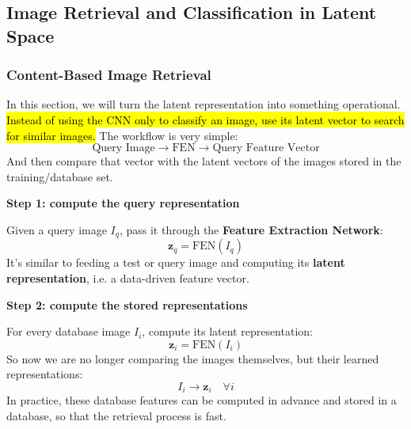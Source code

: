 \subsection{Image Retrieval and Classification in Latent Space}\label{sec:image-retrieval-and-classification-in-latent-space}

\subsubsection{Content-Based Image Retrieval}\label{sec:content-based-image-retrieval}

In this section, we will turn the latent representation into something operational. \hl{Instead of using the CNN only to classify an image, use its latent vector to search for similar images.} The workflow is very simple:
\begin{equation*}
    \text{Query Image} \to \text{FEN} \to \text{Query Feature Vector}
\end{equation*}
And then compare that vector with the latent vectors of the images stored in the training/database set.

\highspace
\begin{flushleft}
    \textcolor{Green3}{ \textbf{Step 1: compute the query representation}}
\end{flushleft}
Given a query image $I_q$, pass it through the \textbf{Feature Extraction Network}:
\begin{equation*}
    \mathbf{z}_{q} = \text{FEN}\left(I_q\right)
\end{equation*}
It's similar to feeding a test or query image and computing its \textbf{latent representation}, i.e. a data-driven feature vector.

\highspace
\begin{flushleft}
    \textcolor{Green3}{ \textbf{Step 2: compute the stored representations}}
\end{flushleft}
For every database image $I_i$, compute its latent representation:
\begin{equation*}
    \mathbf{z}_{i} = \text{FEN}\left(I_i\right)
\end{equation*}
So now we are no longer comparing the images themselves, but their learned representations:
\begin{equation*}
    I_i \to \mathbf{z}_{i} \quad \forall i
\end{equation*}
In practice, these database features can be computed in advance and stored in a database, so that the retrieval process is fast.

